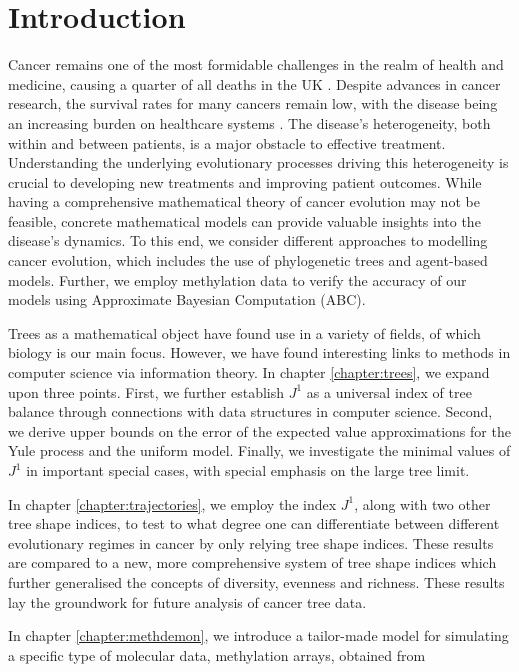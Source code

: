 \chapter{Introduction}\label{chapter:introduction}
Cancer remains one of the most formidable challenges in the realm of health and medicine, causing a quarter of all deaths in the UK \cite{noauthor_cancer_2015}.
Despite advances in cancer research, the survival rates for many cancers remain low, with the disease being an increasing burden on healthcare
systems \cite{noauthor_financial_nodate}. The disease's heterogeneity, both within and between patients, is a major obstacle to effective treatment. Understanding the
underlying evolutionary processes driving this heterogeneity is crucial to developing new treatments and improving patient outcomes.
While having a comprehensive mathematical theory of cancer evolution may not be feasible, concrete mathematical models can provide valuable insights into the
disease's dynamics. To this end, we consider different approaches to modelling cancer evolution, which includes the use of phylogenetic
trees and agent-based models. Further, we employ methylation data to verify the accuracy of our models using Approximate Bayesian Computation (ABC).\par
Trees as a mathematical object have found use in a variety of fields, of which biology is our main focus. However, we have found
interesting links to methods in computer science via information theory.
In chapter \ref{chapter:trees}, we expand upon three points. First, we further establish $J^1$ as a
universal index of tree balance through connections with data structures in computer science. Second, we derive
upper bounds on the error of the expected value approximations for the Yule process and the uniform model.
Finally, we investigate the minimal values of $J^1$ in important special cases,
with special emphasis on the large tree limit. \par
In chapter \ref{chapter:trajectories}, we employ the index $J^1$, along with two other tree shape indices, to
test to what degree one can differentiate between different evolutionary regimes in cancer by only relying
tree shape indices. These results are compared to a new, more comprehensive system of tree shape indices \cite{noble_new_2023}
which further generalised the concepts of diversity, evenness and richness. These results lay the groundwork for
future analysis of cancer tree data.\par
In chapter \ref{chapter:methdemon}, we introduce a tailor-made model for simulating a specific type of molecular data, methylation arrays, obtained from
